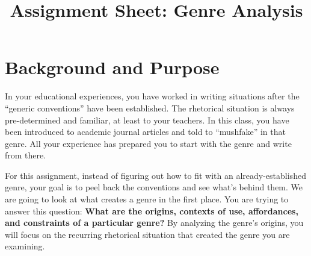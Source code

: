 \documentclass[10pt, oneside, twocolumn]{amsart}	%
\title[Genre Analysis]{Assignment Sheet: Genre Analysis}
\begin{document}
%
\thispagestyle{empty}


\section{Background and Purpose} %
\label{sec:background}
In your educational experiences, you have  worked in writing situations after the ``generic conventions'' have been established. The rhetorical situation is always pre-determined and familiar, at least to your teachers. In this class, you have been introduced to academic journal articles and told to ``mushfake'' in that genre. All your experience has prepared you to start with the genre and write from there.

For this assignment, %
instead of figuring out how to fit with an already-established genre, your goal is to peel back the conventions and see what's behind them. We are going to look at what creates a genre in the first place. You are trying to answer this question: \textbf{What are the origins, contexts of use, affordances, and constraints of a particular genre?} By analyzing the genre's origins, you will focus on the recurring rhetorical situation that created the genre you are examining.

\begin{comment}
	\section{Evaluation} %
	\label{sec:evaluation}
	Your task for this assignment is to identify the characteristics of a genre and its scenes of use. Your work will be assessed using the criteria presented in Table~\ref{tab:rubric}.
\end{comment}
\end{document}
